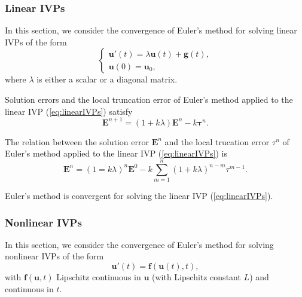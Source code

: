 \label{sec:analys-eulers-meth}

\subsubsection{Linear IVPs}

\label{sec:linear-ivps}
In this section, we consider the convergence of Euler's method
for solving linear IVPs of the form
\begin{equation}
  \label{eq:linearIVPs}
  \begin{cases}
    \mathbf{u}'(t)=\lambda\mathbf{u}(t)+\mathbf{g}(t),\\
    \mathbf{u}(0)=\mathbf{u}_0,
  \end{cases}
\end{equation}
where $\lambda$ is either a scalar or a diagonal matrix.

\begin{lem}
  Solution errors and the local truncation error of Euler's method
  applied to the linear IVP (\ref{eq:linearIVPs}) satisfy
  \begin{equation}
    \label{eq:solutionErrorLinear}
    \mathbf{E}^{n+1}=(1+k\lambda)\mathbf{E}^n-k\mathbf{\tau}^n.
  \end{equation}
\end{lem}

\begin{lem}
  The relation between the solution error $\mathbf{E}^n$ and the local
  trucation error $\tau^n$ of Euler's method applied to the linear
  IVP (\ref{eq:linearIVPs}) is
  \begin{equation}
    \label{eq:relationSoluLocal}
    \mathbf{E}^n=(1=k\lambda)^n\mathbf{E}^0-k\sum_{m=1}^n
    (1+k\lambda)^{n-m}\tau^{m-1}.
  \end{equation}
\end{lem}

\begin{thm}
  Euler's method is convergent for solving the linear IVP (\ref{eq:linearIVPs}).
\end{thm}

\subsubsection{Nonlinear IVPs}

\label{sec:nonlinear-ivps}
In this section, we consider the convergence of Euler's method
for solving nonlinear IVPs of the form
\begin{equation}\label{eq:nonlinarIVPs}
  \mathbf{u}'(t)=\mathbf{f}(\mathbf{u}(t),t),
\end{equation}
with $\mathbf{f}(\mathbf{u},t)$ Lipschitz continuous in $\mathbf{u}$
(with Lipschitz constant $L$)
and continuous in $t$.

